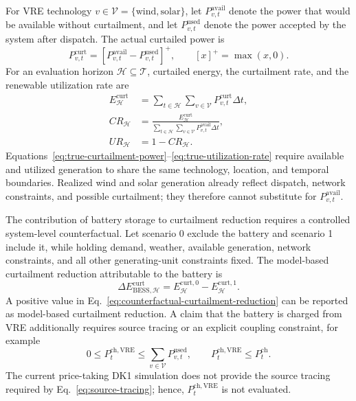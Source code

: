 \documentclass[11pt,a4paper]{article}
\begin{document}
For VRE technology $v\in\mathcal{V}=\{\mathrm{wind},\mathrm{solar}\}$, let $P^{\mathrm{avail}}_{v,t}$ denote the power that would be available without curtailment, and let $P^{\mathrm{used}}_{v,t}$ denote the power accepted by the system after dispatch. The actual curtailed power is
\begin{equation}
  P^{\mathrm{curt}}_{v,t}
  =
  \left[P^{\mathrm{avail}}_{v,t}-P^{\mathrm{used}}_{v,t}\right]^+,
  \qquad [x]^+=\max(x,0).
  \label{eq:true-curtailment-power}
\end{equation}
For an evaluation horizon $\mathcal{H}\subseteq\mathcal{T}$, curtailed energy, the curtailment rate, and the renewable utilization rate are
\begin{align}
  E^{\mathrm{curt}}_{\mathcal{H}}
  &=\sum_{t\in\mathcal{H}}\sum_{v\in\mathcal{V}}
  P^{\mathrm{curt}}_{v,t}\Delta t,
  \label{eq:true-curtailment-energy}\\
  CR_{\mathcal{H}}
  &=\frac{E^{\mathrm{curt}}_{\mathcal{H}}}
  {\displaystyle\sum_{t\in\mathcal{H}}\sum_{v\in\mathcal{V}}
  P^{\mathrm{avail}}_{v,t}\Delta t},
  \label{eq:true-curtailment-rate}\\
  UR_{\mathcal{H}}&=1-CR_{\mathcal{H}}.
  \label{eq:true-utilization-rate}
\end{align}
Equations~\eqref{eq:true-curtailment-power}--\eqref{eq:true-utilization-rate} require available and utilized generation to share the same technology, location, and temporal boundaries. Realized wind and solar generation already reflect dispatch, network constraints, and possible curtailment; they therefore cannot substitute for $P^{\mathrm{avail}}_{v,t}$.

The contribution of battery storage to curtailment reduction requires a controlled system-level counterfactual. Let scenario 0 exclude the battery and scenario 1 include it, while holding demand, weather, available generation, network constraints, and all other generating-unit constraints fixed. The model-based curtailment reduction attributable to the battery is
\begin{equation}
  \Delta E^{\mathrm{curt}}_{\mathrm{BESS},\mathcal{H}}
  =E^{\mathrm{curt},0}_{\mathcal{H}}-E^{\mathrm{curt},1}_{\mathcal{H}}.
  \label{eq:counterfactual-curtailment-reduction}
\end{equation}
A positive value in Eq.~\eqref{eq:counterfactual-curtailment-reduction} can be reported as model-based curtailment reduction. A claim that the battery is charged from VRE additionally requires source tracing or an explicit coupling constraint, for example
\begin{equation}
  0\leq P^{\mathrm{ch,VRE}}_t
  \leq\sum_{v\in\mathcal{V}}P^{\mathrm{used}}_{v,t},
  \qquad P^{\mathrm{ch,VRE}}_t\leq P^{\mathrm{ch}}_t.
  \label{eq:source-tracing}
\end{equation}
The current price-taking DK1 simulation does not provide the source tracing required by Eq.~\eqref{eq:source-tracing}; hence, $P^{\mathrm{ch,VRE}}_t$ is not evaluated.
\end{document}
